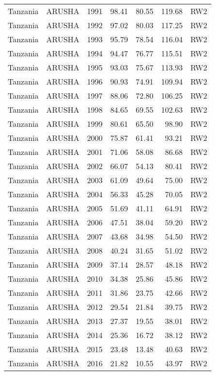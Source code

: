 \begin{longtable}{lllrrrl}
  Tanzania & ARUSHA & 1991 & 98.41 & 80.55 & 119.68 & RW2 \\ 
  Tanzania & ARUSHA & 1992 & 97.02 & 80.03 & 117.25 & RW2 \\ 
  Tanzania & ARUSHA & 1993 & 95.79 & 78.54 & 116.04 & RW2 \\ 
  Tanzania & ARUSHA & 1994 & 94.47 & 76.77 & 115.51 & RW2 \\ 
  Tanzania & ARUSHA & 1995 & 93.03 & 75.67 & 113.93 & RW2 \\ 
  Tanzania & ARUSHA & 1996 & 90.93 & 74.91 & 109.94 & RW2 \\ 
  Tanzania & ARUSHA & 1997 & 88.06 & 72.80 & 106.25 & RW2 \\ 
  Tanzania & ARUSHA & 1998 & 84.65 & 69.55 & 102.63 & RW2 \\ 
  Tanzania & ARUSHA & 1999 & 80.61 & 65.50 & 98.90 & RW2 \\ 
  Tanzania & ARUSHA & 2000 & 75.87 & 61.41 & 93.21 & RW2 \\ 
  Tanzania & ARUSHA & 2001 & 71.06 & 58.08 & 86.68 & RW2 \\ 
  Tanzania & ARUSHA & 2002 & 66.07 & 54.13 & 80.41 & RW2 \\ 
  Tanzania & ARUSHA & 2003 & 61.09 & 49.64 & 75.00 & RW2 \\ 
  Tanzania & ARUSHA & 2004 & 56.33 & 45.28 & 70.05 & RW2 \\ 
  Tanzania & ARUSHA & 2005 & 51.69 & 41.11 & 64.91 & RW2 \\ 
  Tanzania & ARUSHA & 2006 & 47.51 & 38.04 & 59.20 & RW2 \\ 
  Tanzania & ARUSHA & 2007 & 43.68 & 34.98 & 54.50 & RW2 \\ 
  Tanzania & ARUSHA & 2008 & 40.24 & 31.65 & 51.02 & RW2 \\ 
  Tanzania & ARUSHA & 2009 & 37.14 & 28.57 & 48.18 & RW2 \\ 
  Tanzania & ARUSHA & 2010 & 34.38 & 25.86 & 45.86 & RW2 \\ 
  Tanzania & ARUSHA & 2011 & 31.86 & 23.75 & 42.66 & RW2 \\ 
  Tanzania & ARUSHA & 2012 & 29.54 & 21.84 & 39.75 & RW2 \\ 
  Tanzania & ARUSHA & 2013 & 27.37 & 19.55 & 38.01 & RW2 \\ 
  Tanzania & ARUSHA & 2014 & 25.36 & 16.72 & 38.12 & RW2 \\ 
  Tanzania & ARUSHA & 2015 & 23.48 & 13.48 & 40.63 & RW2 \\ 
  Tanzania & ARUSHA & 2016 & 21.82 & 10.55 & 43.97 & RW2 \\ 

\end{longtable}
